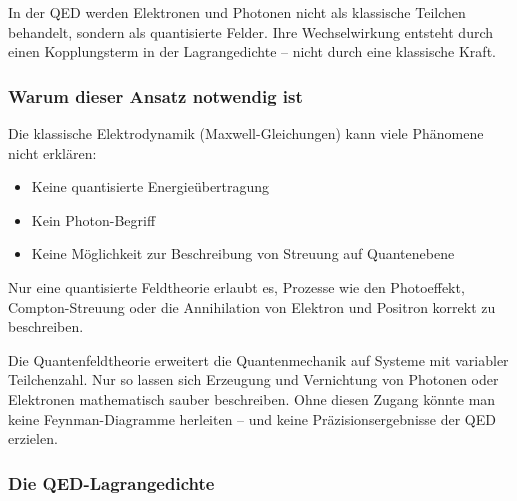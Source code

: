 \vspace{0.5em}
\begin{tcolorbox}[physikbox, title=Feldtheorie statt Teilchenmechanik]
	\label{box:Feldtheorie statt Teilchenmechanik}
	In der QED werden Elektronen und Photonen nicht als klassische Teilchen behandelt, sondern als quantisierte Felder. Ihre Wechselwirkung entsteht durch einen Kopplungsterm in der Lagrangedichte – nicht durch eine klassische Kraft.
\end{tcolorbox}

\subsubsection*{Warum dieser Ansatz notwendig ist}
Die klassische Elektrodynamik (Maxwell-Gleichungen) kann viele Phänomene nicht erklären:
\begin{itemize}
	\item Keine quantisierte Energieübertragung
	\item Kein Photon-Begriff
	\item Keine Möglichkeit zur Beschreibung von Streuung auf Quantenebene
\end{itemize}

Nur eine quantisierte Feldtheorie erlaubt es, Prozesse wie den Photoeffekt, Compton-Streuung oder die Annihilation von Elektron und Positron korrekt zu beschreiben.

\vspace{0.5em}
\begin{tcolorbox}[didaktikbox, title=Warum nicht einfach klassisch?]
	\label{box:Warum nicht einfach klassisch?}
	Die Quantenfeldtheorie erweitert die Quantenmechanik auf Systeme mit variabler Teilchenzahl. Nur so lassen sich Erzeugung und Vernichtung von Photonen oder Elektronen mathematisch sauber beschreiben. Ohne diesen Zugang könnte man keine Feynman-Diagramme herleiten – und keine Präzisionsergebnisse der QED erzielen.
\end{tcolorbox}

\subsubsection{Die QED-Lagrangedichte}

